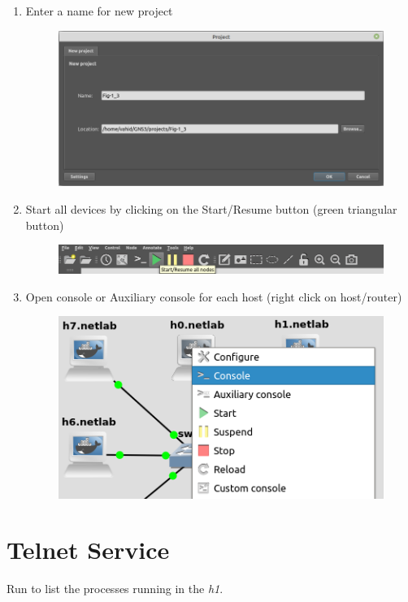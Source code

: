 \documentclass{../UTNetLab}
\begin{document}
\begin{enumerate}
\begin{figure}[H]
        \end{figure}
    \item Enter a name for new project
        \begin{figure}[H]
            \centering
            \includegraphics[scale=0.6]{img/3}
        \end{figure}
    \item Start all devices by clicking on the Start/Resume button (green triangular button)
        \begin{figure}[H]
            \centering
            \includegraphics[scale=0.6]{img/4}
        \end{figure}
    \item Open console or Auxiliary console for each host (right click on host/router)
        \begin{figure}[H]
            \centering
            \includegraphics[scale=0.6]{img/5}
        \end{figure}
\end{enumerate}

\section{Telnet Service}
Run  to list the processes running in the \textit{h1}.
\end{document}
